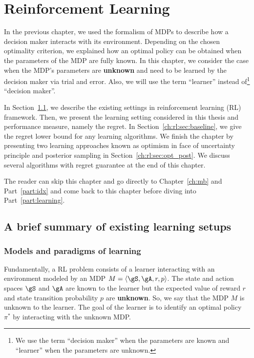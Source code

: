 \begingroup

\let\clearpage\relax

\chapter{Reinforcement Learning}
\label{ch:rl}

In the previous chapter, we used the formalism of MDPs to describe how a decision maker interacts with its environment.
Depending on the chosen optimality criterion, we explained how an optimal policy can be obtained when the parameters of the MDP are fully known.
In this chapter, we consider the case when the MDP's parameters are \textbf{unknown} and need to be learned by the decision maker via trial and error.
Also, we will use the term ``learner'' instead of\footnote{We use the term ``decision maker'' when the parameters are known and ``learner'' when the parameters are unknown.} ``decision maker''.

In Section~\ref{ch:rl:sec:overal}, we describe the existing settings in reinforcement learning (RL) framework.
Then, we present the learning setting considered in this thesis and performance measure, namely the regret. 
In Section~\ref{ch:rl:sec:baseline}, we give the regret lower bound for any learning algorithms.
We finish the chapter by presenting two learning approaches known as optimism in face of uncertainty principle and posterior sampling in Section~\ref{ch:rl:sec:opt_post}.
We discuss several algorithms with regret guarantee at the end of this chapter.

The reader can skip this chapter and go directly to Chapter~\ref{ch:mb} and Part~\ref{part:idx} and come back to this chapter before diving into Part~\ref{part:learning}.

\section{A brief summary of existing learning setups}
\label{ch:rl:sec:overal}

\subsection{Models and paradigms of learning}

Fundamentally, a RL problem consists of a learner interacting with an environment modeled by an MDP $M=\langle\gS,\gA,r,p\rangle$.
The state and action spaces $\gS$ and $\gA$ are known to the learner but the expected value of reward $r$ and state transition probability $p$ are \textbf{unknown}.
So, we say that the MDP $M$ is unknown to the learner.
The goal of the learner is to identify an optimal policy $\pi^*$ by interacting with the unknown MDP.

